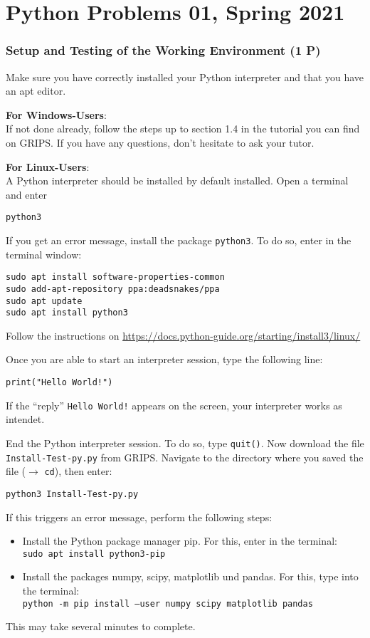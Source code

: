 \documentclass[
	english,
	fontsize=10pt,
	parskip=half,
	titlepage=true,
	DIV=12
]{scrartcl}
\begin{document}
\part*{Python Problems 01, Spring 2021}

\section{Setup and Testing of the Working Environment (1 P)}
Make sure you have correctly installed your Python interpreter and that you have an apt editor.

\textbf{For Windows-Users}:\\
If not done already, follow the steps up to section 1.4 in the tutorial you can find on GRIPS. If you have any questions, don't hesitate to ask your tutor.

\textbf{For Linux-Users}:\\
A Python interpreter should be installed by default installed. Open a terminal and enter
\begin{center}
	\texttt{python3}
\end{center}
If you get an error message, install the package \texttt{python3}. To do so, enter in the terminal window:
\begin{center}
	\texttt{sudo apt install software-properties-common}\\
	\texttt{sudo add-apt-repository ppa:deadsnakes/ppa}\\
	\texttt{sudo apt update}\\
	\texttt{sudo apt install python3}
\end{center}

Follow the instructions on \url{https://docs.python-guide.org/starting/install3/linux/}

Once you are able to start an interpreter session, type the following line:
\begin{center}
	\texttt{print("Hello World!")}
\end{center}
If the \enquote{reply} \texttt{Hello World!} appears on the screen, your interpreter works as intendet.

End the Python interpreter session. To do so, type \texttt{quit()}. Now download the file  \texttt{Install-Test-py.py} from GRIPS. Navigate to the directory where you saved the file ($\rightarrow$ \texttt{cd}), then enter:
\begin{center}
	\texttt{python3 Install-Test-py.py}
\end{center}

If this triggers an error message, perform the following steps:
\begin{itemize}
\item Install the Python package manager pip. For this, enter in the terminal:\\
	\texttt{sudo apt install python3-pip}
\item Install the packages numpy, scipy, matplotlib und pandas. For this, type into the terminal:\\
	\texttt{python -m pip install --user numpy scipy matplotlib pandas}
\end{itemize}
This may take several minutes to complete.
\end{document}
